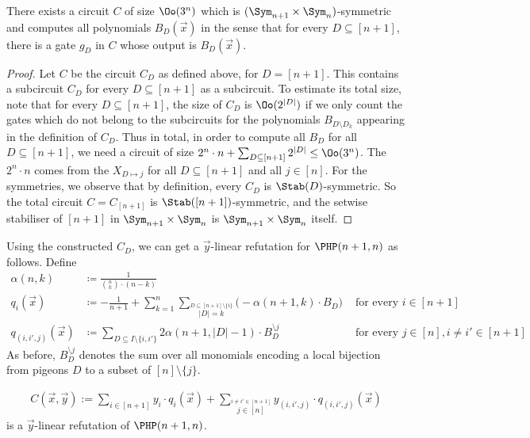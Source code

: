 \documentclass[a4paper,UKenglish,cleveref, autoref, thm-restate]{lipics-v2021}
\begin{document}
\begin{lemma}
	\label{lem:computingAllBijections}
	There exists a circuit $C$ of size $\Oo(3^n)$ which is $(\Sym_{n+1} \times \Sym_{n})$-symmetric and computes all polynomials $B_D(\vec x)$ in the sense that for every $D \subseteq [n+1]$, there is a gate $g_D$ in $C$ whose output is $B_D(\vec x)$.
\end{lemma}	
\begin{proof}
	Let $C$ be the circuit $C_D$ as defined above, for $D = [n+1]$. This contains a subcircuit $C_D$ for every $D \subseteq [n+1]$ as a subcircuit. To estimate its total size, note that for every $D \subseteq [n+1]$, the size of $C_D$ is $\Oo(2^{|D|})$ if we only count the gates which do not belong to the subcircuits for the polynomials $B_{D \setminus D_k}$ appearing in the definition of $C_D$. Thus in total, in order to compute all $B_D$ for all $D \subseteq [n+1]$, we need a circuit of size $2^n \cdot n + \sum_{D \subseteq [n+1]} 2^{|D|} \leq \Oo(3^n)$. The $2^n \cdot n$ comes from the $X_{D \mapsto j}$ for all $D \subseteq [n+1]$ and all $j \in [n]$.
	For the symmetries, we observe that by definition, every $C_D$ is $\Stab(D)$-symmetric. So the total circuit $C = C_{[n+1]}$ is $\Stab([n+1])$-symmetric, and the setwise stabiliser of $[n+1]$ in $\Sym_{n+1} \times \Sym_{n}$ is $\Sym_{n+1} \times \Sym_{n}$ itself.
\end{proof}	
\noindent
Using the constructed $C_D$, we can get a $\vec y$-linear refutation for $\PHP(n+1,n)$ as follows. Define
\begin{align*}
	\alpha(n,k) &\coloneqq  \frac{1}{\binom{n}{k} \cdot (n-k)}\\	
	q_i(\vec x) &\coloneqq -\frac{1}{n+1} +  \sum_{k=1}^n \sum_{\stackrel{D \subseteq [n+1] \setminus \{i\}}{|D| = k}} \Big(- \alpha(n+1,k) \cdot B_D \Big) &\text{ for every } i \in [n+1] \\
	q_{(i,i',j)}(\vec x) &\coloneqq \sum_{D \subseteq I \setminus \{i,i'\}} 2 \alpha(n+1,|D|-1) \cdot B^{\setminus j}_{D} &\text{ for every } j \in [n], i \neq i' \in [n+1]
\end{align*}
As before, $B^{\setminus j}_D$ denotes the sum over all monomials encoding a local bijection from pigeons $D$ to a subset of $[n] \setminus \{j\}$. 
\begin{lemma}
	\begin{align*}
		C(\vec x, \vec y) := \sum_{i \in [n+1]} y_i \cdot q_i(\vec x) + \sum_{\stackrel{i \neq i' \in [n+1]}{j \in [n]}} y_{(i,i',j)} \cdot q_{(i,i',j)}(\vec x)
	\end{align*}	
	is a $\vec y$-linear refutation of $\PHP(n+1,n)$.
\end{lemma}	
\end{document}
